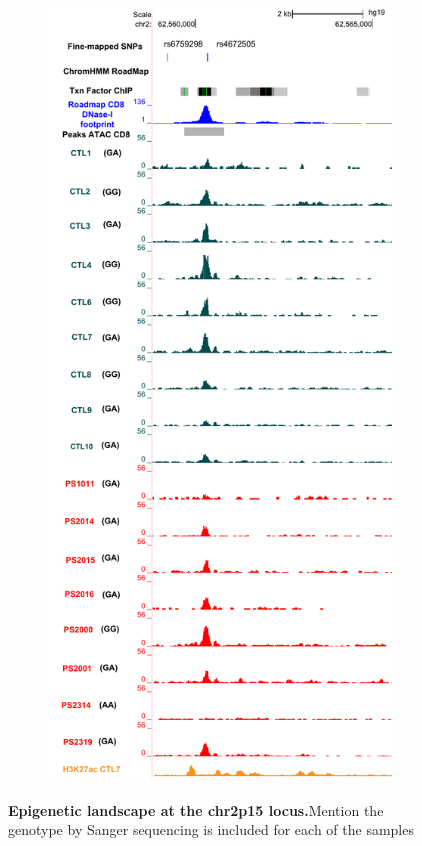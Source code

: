 \begin{figure}[htbp]
\begin{subfigure}{0.5\textwidth}
\includegraphics[width=\textwidth]{./Results2/pdfs/chr2p15_rs4672505_FM_CD8_track_all_marks}
\caption{\textbf{}}
\end{subfigure}
\caption[Epigenetic landscape at the chr2p15 locus.]{\textbf{Epigenetic landscape at the chr2p15 locus.}Mention the genotype by Sanger sequencing is included for each of the samples}
\label{figure:ATAC_PS_CTL_chr2p15_rs4672505}
\end{figure} 


